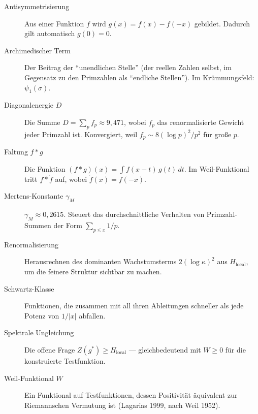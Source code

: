 \documentclass[11pt,a4paper]{article}
\theoremstyle{plain}
\theoremstyle{definition}
\theoremstyle{remark}
\newcommand{\Hlocal}{H_{\mathrm{local}}}
\begin{document}
	\begin{description}
		\item[Antisymmetrisierung]
		Aus einer Funktion $f$ wird $g(x) = f(x) - f(-x)$ gebildet.
		Dadurch gilt automatisch $g(0) = 0$.
		
		\item[Archimedischer Term]
		Der Beitrag der ``unendlichen Stelle'' (der reellen Zahlen selbst,
		im Gegensatz zu den Primzahlen als ``endliche Stellen'').
		Im Kr\"ummungsfeld: $\psi_1(\sigma)$.
		
		\item[Diagonalenergie $D$]
		Die Summe $D = \sum_p f_p \approx 9{,}471$, wobei $f_p$ das
		renormalisierte Gewicht jeder Primzahl ist. Konvergiert, weil
		$f_p \sim 8(\log p)^2/p^2$ f\"ur gro\ss e $p$.
		
		\item[Faltung $f * g$]
		Die Funktion $(f * g)(x) = \int f(x-t)\, g(t)\, dt$.
		Im Weil-Funktional tritt $f * \check{f}$ auf, wobei
		$\check{f}(x) = \overline{f(-x)}$.
		
		\item[Mertens-Konstante $\gamma_M$]
		$\gamma_M \approx 0{,}2615$. Steuert das durchschnittliche
		Verhalten von Primzahl-Summen der Form $\sum_{p \leq x} 1/p$.
		
		\item[Renormalisierung]
		Herausrechnen des dominanten Wachstumsterms $2(\log\kappa)^2$
		aus $\Hlocal$, um die feinere Struktur sichtbar zu machen.
		
		\item[Schwartz-Klasse]
		Funktionen, die zusammen mit all ihren Ableitungen schneller
		als jede Potenz von $1/|x|$ abfallen.
		
		\item[Spektrale Ungleichung]
		Die offene Frage $Z(g^*) \geq \Hlocal$ --- gleichbedeutend mit
		$W \geq 0$ f\"ur die konstruierte Testfunktion.
		
		\item[Weil-Funktional $W$]
		Ein Funktional auf Testfunktionen, dessen Positivit\"at
		\"aquivalent zur Riemannschen Vermutung ist (Lagarias 1999,
		nach Weil 1952).
	\end{description}
	
\end{document}

